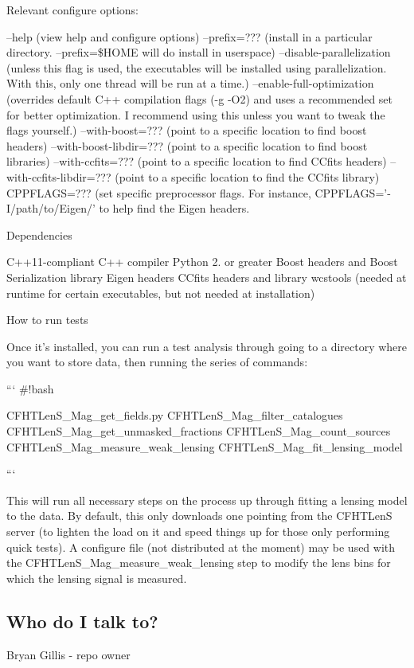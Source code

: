Relevant configure options\-:

--help (view help and configure options) --prefix=??? (install in a particular directory. --prefix=\$\-H\-O\-M\-E will do install in userspace) --disable-\/parallelization (unless this flag is used, the executables will be installed using parallelization. With this, only one thread will be run at a time.) --enable-\/full-\/optimization (overrides default C++ compilation flags (-\/g -\/\-O2) and uses a recommended set for better optimization. I recommend using this unless you want to tweak the flags yourself.) --with-\/boost=??? (point to a specific location to find boost headers) --with-\/boost-\/libdir=??? (point to a specific location to find boost libraries) --with-\/ccfits=??? (point to a specific location to find C\-Cfits headers) --with-\/ccfits-\/libdir=??? (point to a specific location to find the C\-Cfits library) C\-P\-P\-F\-L\-A\-G\-S=??? (set specific preprocessor flags. For instance, C\-P\-P\-F\-L\-A\-G\-S='-\/\-I/path/to/\-Eigen/' to help find the Eigen headers.


\begin{DoxyItemize}
\item Dependencies
\end{DoxyItemize}

C++11-\/compliant C++ compiler Python 2. or greater Boost headers and Boost Serialization library Eigen headers C\-Cfits headers and library wcstools (needed at runtime for certain executables, but not needed at installation)


\begin{DoxyItemize}
\item How to run tests
\end{DoxyItemize}

Once it's installed, you can run a test analysis through going to a directory where you want to store data, then running the series of commands\-:

``` \#!bash

C\-F\-H\-T\-Len\-S\-\_\-\-Mag\-\_\-get\-\_\-fields.\-py C\-F\-H\-T\-Len\-S\-\_\-\-Mag\-\_\-filter\-\_\-catalogues C\-F\-H\-T\-Len\-S\-\_\-\-Mag\-\_\-get\-\_\-unmasked\-\_\-fractions C\-F\-H\-T\-Len\-S\-\_\-\-Mag\-\_\-count\-\_\-sources C\-F\-H\-T\-Len\-S\-\_\-\-Mag\-\_\-measure\-\_\-weak\-\_\-lensing C\-F\-H\-T\-Len\-S\-\_\-\-Mag\-\_\-fit\-\_\-lensing\-\_\-model

```

This will run all necessary steps on the process up through fitting a lensing model to the data. By default, this only downloads one pointing from the C\-F\-H\-T\-Len\-S server (to lighten the load on it and speed things up for those only performing quick tests). A configure file (not distributed at the moment) may be used with the C\-F\-H\-T\-Len\-S\-\_\-\-Mag\-\_\-measure\-\_\-weak\-\_\-lensing step to modify the lens bins for which the lensing signal is measured.

\subsection*{Who do I talk to?}


\begin{DoxyItemize}
\item Bryan Gillis -\/ repo owner 
\end{DoxyItemize}
